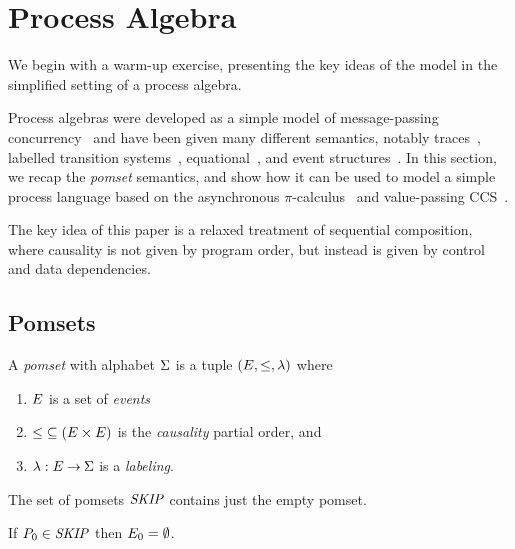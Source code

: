 \section{Process Algebra}

We begin with a warm-up exercise, presenting the key ideas of the
model in the simplified setting of a process algebra.

Process algebras were developed as a simple model of message-passing
concurrency~\cite{CCS,CSP,ACP} and have been given many different
semantics, notably traces~\cite{???}, labelled transition
systems~\cite{???}, equational~\cite{???}, and event
structures~\cite{???}.  In this section, we recap the \emph{pomset}
semantics, and show how it can be used to model a simple process
language based on the asynchronous $\pi$-calculus~\cite{???} and
value-passing CCS~\cite{???}.

The key idea of this paper is a relaxed treatment of sequential
composition, where causality is not given by program order, but
instead is given by control and data dependencies.

\subsection{Pomsets}

\begin{definition}
  A \emph{pomset} with alphabet $\Sigma$ is a tuple
  $(E, {\le}, \lambda)$ where
  \begin{enumerate}
  \item $E$ is a set of \emph{events}
  \item
    ${\le} \subseteq (E\times E)$ is the \emph{causality} partial order, and
  \item
    $\lambda: E \mathbin\rightarrow \Sigma$ is a \emph{labeling}.
  \end{enumerate}
\end{definition}

The set of pomsets $\mathit{SKIP}$ contains just the empty pomset.

\begin{definition}
  If $P_0\in\mathit{SKIP}$ then
  $E_0 = \emptyset$.
\end{definition}

